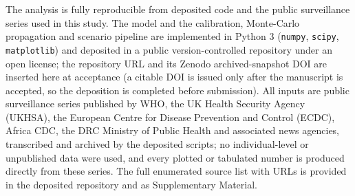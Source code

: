 \documentclass[preprint,12pt,numbers]{elsarticle}
\begin{document}
The analysis is fully reproducible from deposited code and the public
surveillance series used in this study. The model and the calibration, Monte-Carlo
propagation and scenario pipeline are implemented in Python 3
(\texttt{numpy}, \texttt{scipy}, \texttt{matplotlib}) and deposited in a
public version-controlled repository under an open license; the
repository URL and its Zenodo archived-snapshot DOI are inserted here at
acceptance (a citable DOI is issued only after the manuscript is accepted,
so the deposition is completed before submission). All inputs are public surveillance series published by WHO, the UK Health Security Agency (UKHSA), the European Centre for Disease Prevention and Control (ECDC), Africa CDC, the DRC Ministry of Public Health and associated news agencies, transcribed and archived by the deposited scripts; no individual-level or unpublished data were used, and every plotted or tabulated number is produced directly from these series. The full enumerated source list with URLs is provided in the deposited repository and as Supplementary Material.
\end{document}
